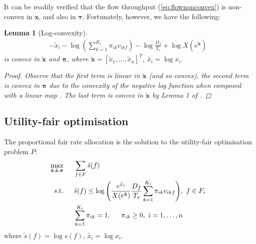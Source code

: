 \documentclass[11pt]{amsart}
\def\m#1{\mathbf{#1}}
\newcommand{\tab}{\hspace*{1.5em}}
\newtheorem{lemma}{Lemma}
\begin{document}
It can be readily verified that the flow throughput (\ref{eq:flownonconvex}) is non-convex in $\m{x}$, and also in $\m{\tau}$.   Fortunately, however, we have the following:
\begin{lemma}[Log-convexity]\label{lem:convexity}
\begin{align}
-\tilde{x}_i - \log \left( \sum_{k=1}^{K_i} \pi_{ik} v_{ikf} \right) - \log \frac{D_f}{T_s} + \log X(e^{\tilde{\m{x}}}) \label{eq:convexity}
\end{align}
is convex in $\tilde{\m{x}}$ and $\boldsymbol \pi$, where $\tilde{\m{x}}=[\tilde{x}_1,\dots,\tilde{x}_n]^T$, $\tilde{x_i} = \log x_i$.
\begin{proof}
Observe that the first term is linear in $\tilde{\m{x}}$ (and so convex), the second term is convex in $\boldsymbol \pi$ due to the convexity of the negative log function when composed with a linear map \cite{boyd2004convex}. The last term is convex in $\tilde{\m{x}}$  by Lemma 1 of \cite{5910091}. 
\end{proof}
\end{lemma}

\subsection{Utility-fair optimisation}
The proportional fair rate allocation is the solution to the utility-fair optimisation problem $P$:
\begin{align}
\underset{\tilde{\m{x}},\tilde{\m{s}},\boldsymbol \pi}\max \tab & \sum_{f \in F} \tilde{s}(f)  \label{eq:objective} \\
\text{s.t.\tab} & {\tilde{s}(f)} \le \log \Bigg (\frac{e^{\tilde{x}_i}}{X(e^{\tilde{\m{x}}})}\frac{D_f}{T_s} \sum_{k=1}^{K_i} \pi_{ik} v_{ikf}  \Bigg ),\ f\in F_i  \label{eq:c1}\\
& \sum_{k=1}^{K_i} \pi_{ik} = 1, \tab \pi_{ik} \ge 0,\ i=1,\dots,n \label{eq:c3} 
\end{align}
where $\tilde{s}(f) = \log s(f)$, $\tilde{x_i} = \log x_i$.    
\end{document}
